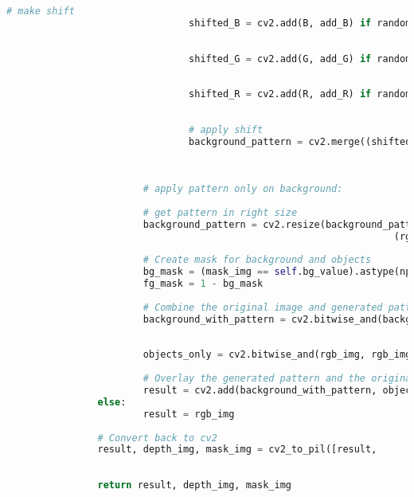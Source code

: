 \begin{lstlisting}[language=Python,caption=Random Augmentation of the Background using cv2 in Python, label=lst:bg-augmentation]
								# make shift
								shifted_B = cv2.add(B, add_B) if random.random() > 0.5 
																								else cv2.subtract(B, add_B)
								
								shifted_G = cv2.add(G, add_G) if random.random() > 0.5 
																								else cv2.subtract(G, add_G)
								
								shifted_R = cv2.add(R, add_R) if random.random() > 0.5 
																								else cv2.subtract(R, add_R)
								
								# apply shift
								background_pattern = cv2.merge((shifted_B, 
																									shifted_G, 
																									shifted_R))
								
						# apply pattern only on background:
						
						# get pattern in right size
						background_pattern = cv2.resize(background_pattern, 
																	(rgb_img.shape[1], rgb_img.shape[0]))
						
						# Create mask for background and objects
						bg_mask = (mask_img == self.bg_value).astype(np.uint8)
						fg_mask = 1 - bg_mask
						
						# Combine the original image and generated pattern
						background_with_pattern = cv2.bitwise_and(background_pattern, 
																													background_pattern, 
																													mask=bg_mask)
						objects_only = cv2.bitwise_and(rgb_img, rgb_img, mask=fg_mask)
						
						# Overlay the generated pattern and the original objects
						result = cv2.add(background_with_pattern, objects_only)
				else:
						result = rgb_img
				
				# Convert back to cv2
				result, depth_img, mask_img = cv2_to_pil([result, 
																										depth_img, 
																										mask_img])
				return result, depth_img, mask_img
		\end{lstlisting}
		
